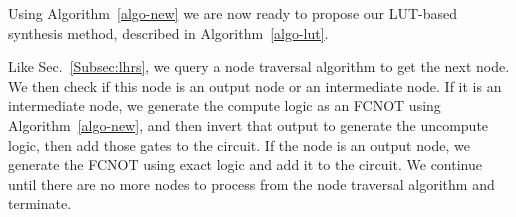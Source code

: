 Using Algorithm~\ref{algo-new} we are now ready to propose our LUT-based synthesis
method, described in Algorithm~\ref{algo-lut}.

Like Sec.~\ref{Subsec:lhrs}, we query a node traversal algorithm to get the next
node. We then check if this node is an output node or an intermediate node. If it is an
intermediate node, we generate the compute logic as an FCNOT using Algorithm~\ref{algo-new},
and then invert that output to generate the uncompute logic, then add those gates to the
circuit. If the node is an output node, we generate the FCNOT using exact logic and add
it to the circuit. We continue until there are no more nodes to process from the node
traversal algorithm and terminate.




